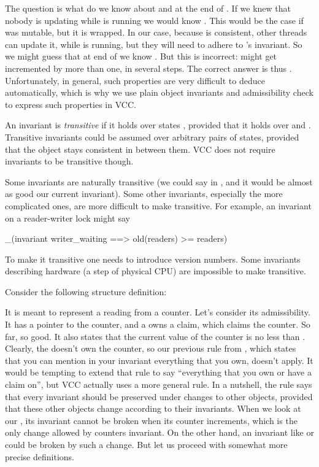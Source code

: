 \noindent
The question is what do we know about  and 
at the end of .
If we knew that nobody is updating  while 
is running we would know .
This would be the case if  was mutable, but it is wrapped.
In our case, because  is consistent, other threads can update it,
while  is running, but they will need to
adhere to 's invariant.
So we might guess that at end of  we know
.
But this is incorrect:  might get incremented
by more than one, in several steps.
The correct answer is thus .
Unfortunately, in general, such properties are very difficult to deduce
automatically, which is why we use plain object invariants and admissibility
check to express such properties in VCC.

\begin{note}
An invariant is \emph{transitive} if it holds over states ,
provided that it holds over  and .
Transitive invariants could be assumed over arbitrary
pairs of states, provided that the object stays consistent
in between them. 
VCC does not require invariants to be transitive though.

Some invariants are naturally transitive (\eg we could say
 in ,
and it would be almost as good our current invariant).
Some other invariants, especially the more complicated ones,
are more difficult to make transitive.
For example, an invariant on a reader-writer lock might say
\begin{VCC}
_(invariant writer_waiting ==> old(readers) >= readers)
\end{VCC}
\noindent
To make it transitive one needs to introduce version numbers.
Some invariants describing hardware (\eg a step of physical CPU)
are impossible to make transitive.
\end{note}

Consider the following structure definition:


\noindent 
It is meant to represent a reading from a counter.
Let's consider its admissibility.
It has a pointer to the counter, and a owns a claim, which
claims the counter.
So far, so good.
It also states that the current value of the counter is no less than .
Clearly, the  doesn't own the counter, so our previous rule
from , which states
that you can mention in your invariant everything that you own, doesn't apply.
It would be tempting to extend that rule to say ``everything that you own
or have a claim on'', but VCC actually uses a more general rule.
In a nutshell, the rule says that every invariant should be preserved
under changes to other objects, provided that these other objects change
according to their invariants.
When we look at our , its invariant cannot be broken when
its counter increments, which is the only change allowed by counters invariant.
On the other hand, an invariant like  or 
could be broken by such a change.
But let us proceed with somewhat more precise definitions.

